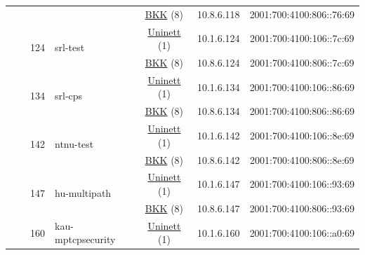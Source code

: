 \begin{small}
\begin{center}
\begin{longtable}{|c|c|c|c|c|c|c|c|}
  &  &  &  & \multicolumn{2}{|c|}{\tiny{\href{http://bkk.no}{BKK} (8)}} & \tiny{10.8.6.118} & \tiny{2001:700:4100:806::76:69} \\* \cline{3-3}\cline{4-4}\cline{5-5}\cline{6-6}\cline{7-7}\cline{8-8}
  &  & \multirow{2}{*}{\tiny{124}} & \multicolumn{1}{|l|}{\multirow{2}{*}{\tiny{srl-test}}} & \multicolumn{2}{|c|}{\tiny{\href{https://www.uninett.no}{Uninett} (1)}} & \tiny{10.1.6.124} & \tiny{2001:700:4100:106::7c:69} \\* \cline{5-5}\cline{6-6}\cline{7-7}\cline{8-8}
  &  &  &  & \multicolumn{2}{|c|}{\tiny{\href{http://bkk.no}{BKK} (8)}} & \tiny{10.8.6.124} & \tiny{2001:700:4100:806::7c:69} \\* \cline{3-3}\cline{4-4}\cline{5-5}\cline{6-6}\cline{7-7}\cline{8-8}
  &  & \multirow{2}{*}{\tiny{134}} & \multicolumn{1}{|l|}{\multirow{2}{*}{\tiny{srl-cps}}} & \multicolumn{2}{|c|}{\tiny{\href{https://www.uninett.no}{Uninett} (1)}} & \tiny{10.1.6.134} & \tiny{2001:700:4100:106::86:69} \\* \cline{5-5}\cline{6-6}\cline{7-7}\cline{8-8}
  &  &  &  & \multicolumn{2}{|c|}{\tiny{\href{http://bkk.no}{BKK} (8)}} & \tiny{10.8.6.134} & \tiny{2001:700:4100:806::86:69} \\* \cline{3-3}\cline{4-4}\cline{5-5}\cline{6-6}\cline{7-7}\cline{8-8}
  &  & \multirow{2}{*}{\tiny{142}} & \multicolumn{1}{|l|}{\multirow{2}{*}{\tiny{ntnu-test}}} & \multicolumn{2}{|c|}{\tiny{\href{https://www.uninett.no}{Uninett} (1)}} & \tiny{10.1.6.142} & \tiny{2001:700:4100:106::8e:69} \\* \cline{5-5}\cline{6-6}\cline{7-7}\cline{8-8}
  &  &  &  & \multicolumn{2}{|c|}{\tiny{\href{http://bkk.no}{BKK} (8)}} & \tiny{10.8.6.142} & \tiny{2001:700:4100:806::8e:69} \\* \cline{3-3}\cline{4-4}\cline{5-5}\cline{6-6}\cline{7-7}\cline{8-8}
  &  & \multirow{2}{*}{\tiny{147}} & \multicolumn{1}{|l|}{\multirow{2}{*}{\tiny{hu-multipath}}} & \multicolumn{2}{|c|}{\tiny{\href{https://www.uninett.no}{Uninett} (1)}} & \tiny{10.1.6.147} & \tiny{2001:700:4100:106::93:69} \\* \cline{5-5}\cline{6-6}\cline{7-7}\cline{8-8}
  &  &  &  & \multicolumn{2}{|c|}{\tiny{\href{http://bkk.no}{BKK} (8)}} & \tiny{10.8.6.147} & \tiny{2001:700:4100:806::93:69} \\* \cline{3-3}\cline{4-4}\cline{5-5}\cline{6-6}\cline{7-7}\cline{8-8}
  &  & \multirow{2}{*}{\tiny{160}} & \multicolumn{1}{|l|}{\multirow{2}{*}{\tiny{kau-mptcpsecurity}}} & \multicolumn{2}{|c|}{\tiny{\href{https://www.uninett.no}{Uninett} (1)}} & \tiny{10.1.6.160} & \tiny{2001:700:4100:106::a0:69} \\* \cline{5-5}\cline{6-6}\cline{7-7}\cline{8-8}

\end{longtable}
\end{center}
\end{small}
